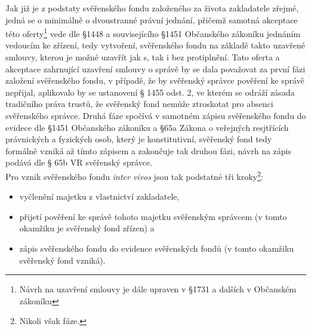 \documentclass{article}
\begin{document}

Jak již je z podstaty svěřenského fondu založeného za života zakladatele zřejmé, jedná se o minimálně o dvoustranné právní jednání, přičemž samotná akceptace této oferty\footnote{Návrh na uzavření smlouvy je dále upraven v §1731 a dalších v Občanském zákoníku} vede dle §1448 a souvisejícího §1451 Občanského zákoníku jednáním vedoucím ke zřízení, tedy vytvoření, svěřenského fondu na základě takto uzavřené smlouvy, kterou je možné uzavřít jak s, tak i bez protiplnění. Tato oferta a akceptace zahrnující uzavření smlouvy o správě by se dala považovat za první fázi založení svěřenského fondu, v případě, že by svěřenský správce pověření ke správě nepřijal, aplikovalo by se ustanovení § 1455 odst. 2, ve kterém se odráží zásada tradičního práva trustů, že svěřenský fond nemůže ztroskotat pro absenci svěřenského správce. Druhá fáze spočívá v samotném zápisu svěřenského fondu do evidece dle §1451 Občanského zákoníku a §65a Zákona o veřejných resjtřících právnických a fyzických osob, který je konstitutivní, svěřenský fond tedy formálně vzniká až tímto zápisem a zakončuje tak druhou fázi, návrh na zápis podává dle § 65b VR svěřenský správce.\\

Pro vznik svěřenského fondu \textit{inter vivos} jsou tak podstatné tři kroky\footnote{Nikoli však fáze.}: \\

\begin{itemize}
\item vyčlenění majetku z vlastnictví zakladatele,
\item přijetí pověření ke správě tohoto majetku svěřenským správcem (v tomto okamžiku je svěřenský fond zřízen) a
\item zápis svěřenského fondu do evidence svěřenských fondů (v tomto okamžiku svěřenský fond vzniká).\\	
\end{itemize}
\end{document}
